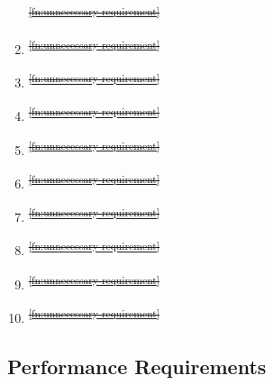 \documentclass[a4paper,12pt,twoside]{article}
\providecommand{\DIFdeltex}[1]{{\protect\color{red}\sout{#1}}}                      %
\providecommand{\DIFdelbegin}{} %
\providecommand{\DIFdelend}{} %
\providecommand{\DIFdel}[1]{\texorpdfstring{\DIFdeltex{#1}}{}} %
\newcommand{\DIFscaledelfig}{0.5}
\newlength{\DIFdelgraphicswidth} %
\newlength{\DIFdelgraphicsheight} %
\newcommand{\DIFdelincludegraphics}[2][]{%
\sbox{\DIFdelgraphicsbox}{\DIFOincludegraphics[#1]{#2}}%
\settoboxwidth{\DIFdelgraphicswidth}{\DIFdelgraphicsbox} %
\settoboxtotalheight{\DIFdelgraphicsheight}{\DIFdelgraphicsbox} %
\scalebox{\DIFscaledelfig}{%
\parbox[b]{\DIFdelgraphicswidth}{\usebox{\DIFdelgraphicsbox}\\[-\baselineskip] \rule{\DIFdelgraphicswidth}{0em}}\llap{\resizebox{\DIFdelgraphicswidth}{\DIFdelgraphicsheight}{%
\setlength{\unitlength}{\DIFdelgraphicswidth}%
\begin{picture}(1,1)%
\thicklines\linethickness{2pt} %
{\color[rgb]{1,0,0}\put(0,0){\framebox(1,1){}}}%
{\color[rgb]{1,0,0}\put(0,0){\line( 1,1){1}}}%
{\color[rgb]{1,0,0}\put(0,1){\line(1,-1){1}}}%
\end{picture}%
}\hspace*{3pt}}} %
} %
\DeclareRobustCommand{\DIFdelbegin}{\DIFOdelbegin \let\includegraphics\DIFdelincludegraphics} %
\DeclareRobustCommand{\DIFdelend}{\DIFOaddend \let\includegraphics\DIFOincludegraphics} %
\begin{document}
\begin{enumerate}
\DIFdel{\textsuperscript{\ref{fn:unnecessary-requirement}}
    }%
\item%
\DIFdel{\textsuperscript{\ref{fn:unnecessary-requirement}}
    }%
\item%
\DIFdel{\textsuperscript{\ref{fn:unnecessary-requirement}}
    }%
\item%
\DIFdel{\textsuperscript{\ref{fn:unnecessary-requirement}}
    }%
\item%
\DIFdel{\textsuperscript{\ref{fn:unnecessary-requirement}}
    }%
\item%
\DIFdel{\textsuperscript{\ref{fn:unnecessary-requirement}}
    }%
\item%
\DIFdel{\textsuperscript{\ref{fn:unnecessary-requirement}}
    }%
\item%
\DIFdel{\textsuperscript{\ref{fn:unnecessary-requirement}}
    }%
\item%
\DIFdel{\textsuperscript{\ref{fn:unnecessary-requirement}}
    }%
\item%
\DIFdel{\textsuperscript{\ref{fn:unnecessary-requirement}}
}\DIFdelend \end{enumerate}
\DIFdelbegin %
\DIFdelend \subsection{Performance Requirements}
\end{document}
